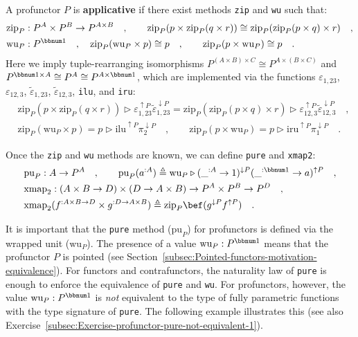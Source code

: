 A profunctor $P$ is \textbf{applicative} if there exist methods \lstinline!zip!
and \lstinline!wu! such that:
\begin{align*}
 & \text{zip}_{P}:P^{A}\times P^{B}\rightarrow P^{A\times B}\quad,\quad\quad\text{zip}_{P}(p\times\text{zip}_{P}(q\times r))\cong\text{zip}_{P}(\text{zip}_{P}(p\times q)\times r)\quad,\\
 & \text{wu}_{P}:P^{\bbnum 1}\quad,\quad\text{zip}_{P}(\text{wu}_{P}\times p)\cong p\quad,\quad\quad\text{zip}_{P}(p\times\text{wu}_{P})\cong p\quad.
\end{align*}
Here we imply tuple-rearranging isomorphisms $P^{(A\times B)\times C}\cong P^{A\times(B\times C)}$
and $P^{\bbnum 1\times A}\cong P^{A}\cong P^{A\times\bbnum 1}$, which
are implemented via the functions $\varepsilon_{1,23}$, $\varepsilon_{12,3}$,
$\tilde{\varepsilon}_{1,23}$, $\tilde{\varepsilon}_{12,3}$, \lstinline!ilu!,
and \lstinline!iru!:
\begin{align*}
 & \text{zip}_{P}(p\times\text{zip}_{P}(q\times r))\triangleright\varepsilon_{1,23}^{\uparrow P}\tilde{\varepsilon}_{1,23}^{\downarrow P}=\text{zip}_{P}(\text{zip}_{P}(p\times q)\times r)\triangleright\varepsilon_{12,3}^{\uparrow P}\tilde{\varepsilon}_{12,3}^{\downarrow P}\quad,\\
 & \text{zip}_{P}(\text{wu}_{P}\times p)=p\triangleright\text{ilu}^{\uparrow P}\pi_{2}^{\downarrow P}\quad,\quad\quad\text{zip}_{P}(p\times\text{wu}_{P})=p\triangleright\text{iru}^{\uparrow P}\pi_{1}^{\downarrow P}\quad.
\end{align*}

Once the \lstinline!zip! and \lstinline!wu! methods are known, we
can define \lstinline!pure! and \lstinline!xmap2!:
\begin{align*}
 & \text{pu}_{P}:A\rightarrow P^{A}\quad,\quad\quad\text{pu}_{P}(a^{:A})\triangleq\text{wu}_{P}\triangleright(\_^{:A}\rightarrow1)^{\downarrow P}(\_^{:\bbnum 1}\rightarrow a)^{\uparrow P}\quad,\\
 & \text{xmap}_{2}:(A\times B\rightarrow D)\times(D\rightarrow A\times B)\rightarrow P^{A}\times P^{B}\rightarrow P^{D}\quad,\\
 & \text{xmap}_{2}(f^{:A\times B\rightarrow D}\times g^{:D\rightarrow A\times B})\triangleq\text{zip}_{P}\bef(g^{\downarrow P}f^{\uparrow P})\quad.
\end{align*}

It is important that the \lstinline!pure! method ($\text{pu}_{P}$)
for profunctors is defined via the wrapped unit ($\text{wu}_{P}$).
The presence of a value $\text{wu}_{P}:P^{\bbnum 1}$ means that the
profunctor $P$ is pointed (see Section~\ref{subsec:Pointed-functors-motivation-equivalence}).
For functors and contrafunctors, the naturality law of \lstinline!pure!
is enough to enforce the equivalence of \lstinline!pure! and \lstinline!wu!.
For profunctors, however, the value $\text{wu}_{P}:P^{\bbnum 1}$
is \emph{not} equivalent to the type of fully parametric functions
with the type signature of \lstinline!pure!. The following example
illustrates this (see also Exercise~\ref{subsec:Exercise-profunctor-pure-not-equivalent-1}).

